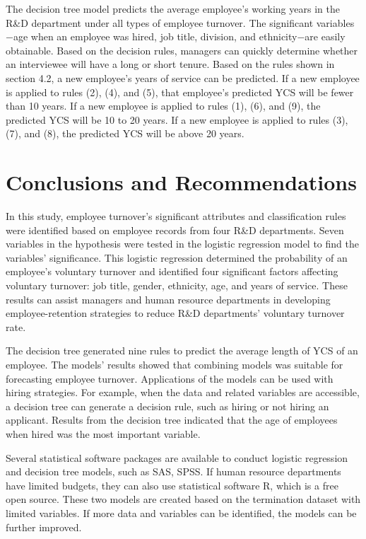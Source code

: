 The decision tree model predicts the average employee's working years in the R\&D department under all types of employee turnover. The significant variables$-$age when an employee was hired, job title, division, and ethnicity$-$are easily obtainable. Based on the decision rules, managers can quickly determine whether an interviewee will have a long or short tenure. Based on the rules shown in section 4.2, a new employee's years of service can be predicted. If a new employee is applied to rules (2), (4), and (5), that employee's predicted YCS will be fewer than 10 years. If a new employee is applied to rules (1), (6), and (9), the predicted YCS will be 10 to 20 years. If a new employee is applied to rules (3), (7), and (8), the predicted YCS will be above 20 years.
\section{Conclusions and Recommendations}
In this study, employee turnover's significant attributes and classification rules were identified based on employee records from four R\&D departments. Seven variables in the hypothesis were tested in the logistic regression model to find the variables' significance. This logistic regression determined the probability of an employee's voluntary turnover and identified four significant factors affecting voluntary turnover: job title, gender, ethnicity, age, and years of service. These results can assist managers and human resource departments in developing employee-retention strategies to reduce R\&D departments' voluntary turnover rate.  
 
The decision tree generated nine rules to predict the average length of YCS of an employee. The models' results showed that combining models was suitable for forecasting employee turnover. Applications of the models can be used with hiring strategies. For example, when the data and related variables are accessible, a decision tree can generate a decision rule, such as hiring or not hiring an applicant. Results from the decision tree indicated that the age of employees when hired was the most important variable. 

Several statistical software packages are available to conduct logistic regression and decision tree models, such as SAS, SPSS. If human resource departments have limited budgets, they can also use statistical software R, which is a free open source. These two models are created based on the termination dataset with limited variables. If more data and variables can be identified, the models can be further improved. 



